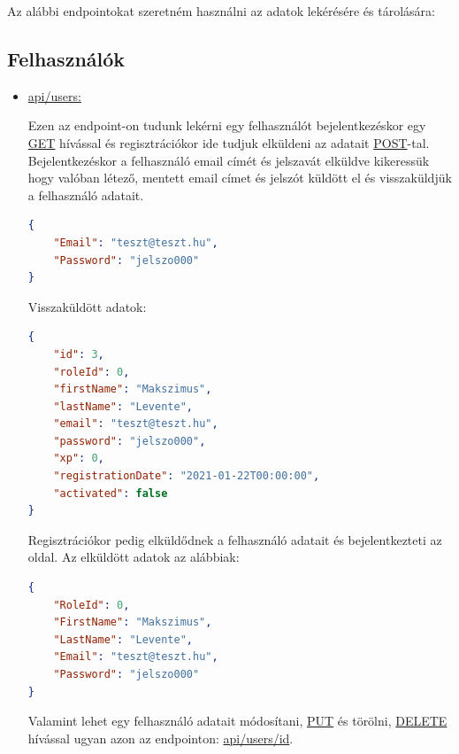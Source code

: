 
Az alábbi endpointokat szeretném használni az adatok lekérésére és tárolására:
\subsection{Felhasználók}
\begin{itemize}[label={$\bullet$}, topsep=0pt, itemsep=0pt, leftmargin=15pt]
    \item[] {\url{api/users:}}
          \begin{addmargin}[\parindent]{0pt}
              Ezen az endpoint-on tudunk lekérni egy felhasználót bejelentkezéskor egy \url{GET} hívással és regisztrációkor ide tudjuk elküldeni az adatait \url{POST}-tal. Bejelentkezéskor a felhasználó email címét és jelszavát elküldve kikeressük hogy valóban létező, mentett email címet és jelszót küldött el és visszaküldjük a felhasználó adatait.

              \begin{lstlisting}[language=json,firstnumber=1]
{
    "Email": "teszt@teszt.hu",
    "Password": "jelszo000"
}
            \end{lstlisting}

              Visszaküldött adatok:
              \begin{lstlisting}[language=json,firstnumber=1]
{
    "id": 3,
    "roleId": 0,
    "firstName": "Makszimus",
    "lastName": "Levente",
    "email": "teszt@teszt.hu",
    "password": "jelszo000",
    "xp": 0,
    "registrationDate": "2021-01-22T00:00:00",
    "activated": false
}
            \end{lstlisting}

              Regisztrációkor pedig elküldődnek a felhasználó adatait és bejelentkezteti az oldal. Az elküldött adatok az alábbiak:

              \begin{lstlisting}[language=json,firstnumber=1]
{
    "RoleId": 0,
    "FirstName": "Makszimus",
    "LastName": "Levente",
    "Email": "teszt@teszt.hu",
    "Password": "jelszo000"
}
            \end{lstlisting}

              Valamint lehet egy felhasználó adatait módosítani, \url{PUT} és törölni, \url{DELETE} hívással ugyan azon az endpointon: \url{api/users/id}.
          \end{addmargin}
\end{itemize}

